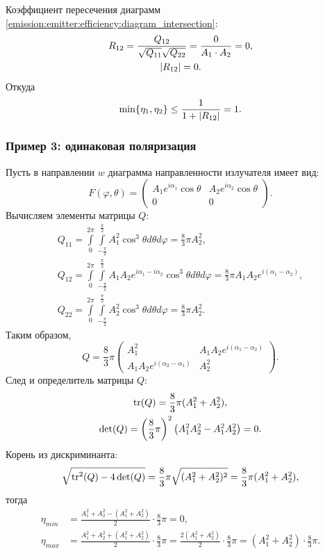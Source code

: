 Коэффициент пересечения диаграмм \eqref{emission:emitter:efficiency:diagram_intersection}:
\begin{gather*}
    R_{12}
    = \frac{Q_{12}}{\sqrt{Q_{11}} \sqrt{Q_{22}}}
    = \frac{0}{A_1 \cdot A_2}
    = 0, \\
    \left | R_{12} \right | = 0 .
\end{gather*}
Откуда
\[
    \min \{ \eta_1, \eta_2 \} \le \frac{1}{1 + \left | R_{12} \right |} = 1.
\]

\subsubsection{Пример 3: одинаковая поляризация}

Пусть в направлении $w$ диаграмма направленности излучателя имеет вид:
\[
    F(\varphi, \theta)
    = \begin{pmatrix}
        A_1 e^{i \alpha_1} \cos \theta & A_2 e^{i \alpha_2} \cos \theta \\
        0                              & 0
    \end{pmatrix} .
\]
Вычисляем элементы матрицы $Q$:
\begin{gather*}
    Q_{11}
    = \int \limits_0^{2 \pi} \int \limits_{-\frac{\pi}{2}}^\frac{\pi}{2} A_1^2 \cos^3 \theta d\theta d\varphi
    = \frac{8}{3} \pi A_2^2 , \\
    Q_{12}
    = \int \limits_0^{2 \pi} \int \limits_{-\frac{\pi}{2}}^\frac{\pi}{2} A_1 A_2 e^{i \alpha_1 - i \alpha_2} \cos^3 \theta d\theta d\varphi
    = \frac{8}{3} \pi A_1 A_2 e^{i(\alpha_1 - \alpha_2)} , \\
    Q_{22}
    = \int \limits_0^{2 \pi} \int \limits_{-\frac{\pi}{2}}^\frac{\pi}{2} A_2^2 \cos^3 \theta d\theta d\varphi
    = \frac{8}{3} \pi A_2^2 .
\end{gather*}
Таким образом,
\[
    Q
    = \frac{8}{3} \pi
    \begin{pmatrix}
        A_1^2                              & A_1 A_2 e^{i(\alpha_1 - \alpha_2)} \\
        A_1 A_2 e^{i(\alpha_2 - \alpha_1)} & A_2^2
    \end{pmatrix} .
\]
След и определитель матрицы $Q$:
\begin{gather*}
    \operatorname{tr}(Q) = \frac{8}{3} \pi ( A_1^2 + A_2^2 ) , \\
    \det(Q)
    = \left( \frac{8}{3} \pi \right)^2 \left( A_1^2 A_2^2 - A_1^2 A_2^2 \right)
    = 0 .
\end{gather*}
Корень из дискриминанта:
\[
    \sqrt{\operatorname{tr}^2(Q) - 4 \det(Q)}
    = \frac{8}{3} \pi \sqrt{( A_1^2 + A_2^2 )^2}
    = \frac{8}{3} \pi ( A_1^2 + A_2^2 ),
\]
тогда
\begin{align*}
    \eta_{min} &
    = \frac{A_1^2 + A_2^2 - ( A_1^2 + A_2^2 )}{2} \cdot \frac{8}{3} \pi
    = 0 ,        \\
    \eta_{max} &
    = \frac{A_1^2 + A_2^2 + ( A_1^2 + A_2^2 )}{2} \cdot \frac{8}{3} \pi
    = \frac{2 (A_1^2 + A_2^2)}{2} \cdot \frac{8}{3} \pi
    = (A_1^2 + A_2^2) \cdot \frac{8}{3} \pi .
\end{align*}

